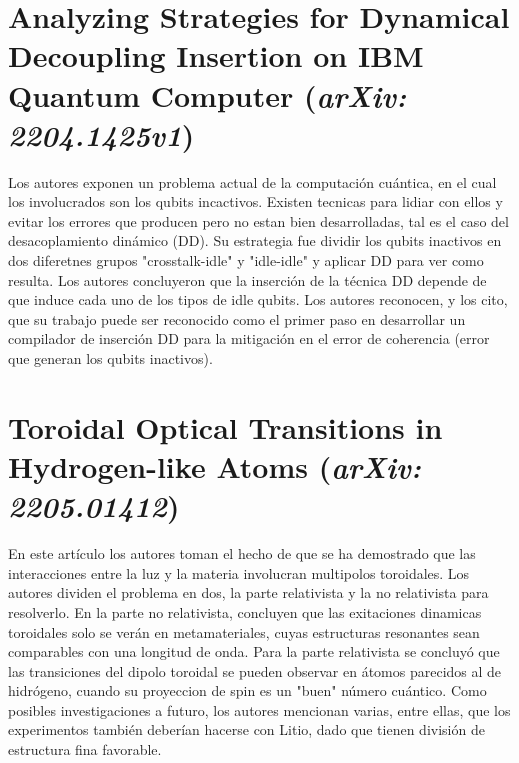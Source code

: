 \section{Analyzing Strategies for Dynamical Decoupling Insertion on IBM Quantum Computer (\textit{arXiv: 2204.1425v1})}
\justify
Los autores exponen un problema actual de la computación cuántica, en el cual los involucrados son los qubits incactivos. Existen tecnicas para lidiar con ellos y evitar los errores que producen pero no estan bien desarrolladas, tal es el caso del desacoplamiento dinámico (DD). Su estrategia fue dividir los qubits inactivos en dos diferetnes grupos "crosstalk-idle" y "idle-idle" y aplicar DD para ver como resulta. Los autores concluyeron que la inserción de la técnica DD depende de que induce cada uno de los tipos de idle qubits. Los autores reconocen, y los cito, que su trabajo puede ser reconocido como el primer paso en desarrollar un compilador de inserción DD para la mitigación en el error de coherencia (error que generan los qubits inactivos).

\section{Toroidal Optical Transitions in Hydrogen-like Atoms (\textit{arXiv: 2205.01412})}
\justify
En este artículo los autores toman el hecho de que se ha demostrado que las interacciones entre la luz y la materia involucran multipolos toroidales. Los autores dividen el problema en dos, la parte relativista y la no relativista para resolverlo. En la parte no relativista, concluyen que las exitaciones dinamicas toroidales solo se verán en metamateriales, cuyas estructuras resonantes sean comparables con una longitud de onda. Para la parte relativista se concluyó que las transiciones del dipolo toroidal se pueden observar en átomos parecidos al de hidrógeno, cuando su proyeccion de spin es un "buen" número cuántico. Como posibles investigaciones a futuro, los autores mencionan varias, entre ellas, que los experimentos también deberían hacerse con Litio, dado que tienen división de estructura fina favorable.




%





%
%





